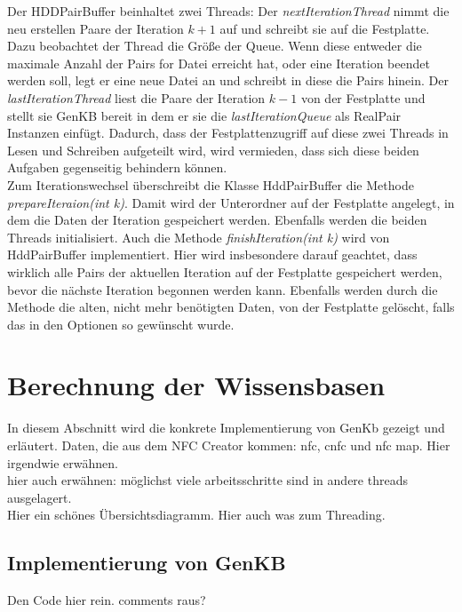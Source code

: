\documentclass[12pt,a4paper]{article}
\begin{document}
Der HDDPairBuffer beinhaltet zwei Threads: Der \textit{nextIterationThread} nimmt die neu erstellen Paare der Iteration $k+1$ auf und schreibt sie auf die Festplatte. Dazu beobachtet der Thread die Größe der Queue. Wenn diese entweder die maximale Anzahl der Pairs for Datei erreicht hat, oder eine Iteration beendet werden soll, legt er eine neue Datei an und schreibt in diese die Pairs hinein. Der \textit{lastIterationThread} liest die Paare der Iteration $k-1$ von der Festplatte und stellt sie GenKB bereit in dem er sie die \textit{lastIterationQueue} als RealPair Instanzen einfügt. Dadurch, dass der Festplattenzugriff auf diese zwei Threads in Lesen und Schreiben aufgeteilt wird, wird vermieden, dass sich diese beiden Aufgaben gegenseitig behindern können. \\
Zum Iterationswechsel überschreibt die Klasse HddPairBuffer die Methode \textit{prepareIteraion(int k)}. Damit wird der Unterordner auf der Festplatte angelegt, in dem die Daten der Iteration gespeichert werden. Ebenfalls werden die beiden Threads initialisiert. Auch die Methode \textit{finishIteration(int k)} wird von HddPairBuffer implementiert. Hier wird insbesondere darauf geachtet, dass wirklich alle Pairs der aktuellen Iteration auf der Festplatte gespeichert werden, bevor die nächste Iteration begonnen werden kann. Ebenfalls werden durch die Methode die alten, nicht mehr benötigten Daten, von der Festplatte gelöscht, falls das in den Optionen so gewünscht wurde.




\section{Berechnung der Wissensbasen}
In diesem Abschnitt wird die konkrete Implementierung von GenKb gezeigt und erläutert.
Daten, die aus dem NFC Creator kommen: nfc, cnfc und nfc map. Hier irgendwie erwähnen. \\
hier auch erwähnen: möglichst viele arbeitsschritte sind in andere threads ausgelagert. \\



Hier ein schönes Übersichtsdiagramm. Hier auch was zum Threading.


\subsection{Implementierung von GenKB}
Den Code hier rein. comments raus?
\end{document}
